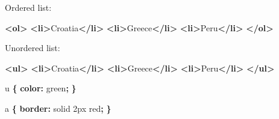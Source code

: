 \documentclass[]{memoir}
\newenvironment{Shaded}{}{}
\newcommand{\KeywordTok}[1]{\textcolor[rgb]{0.00,0.44,0.13}{\textbf{{#1}}}}
\newcommand{\DataTypeTok}[1]{\textcolor[rgb]{0.56,0.13,0.00}{{#1}}}
\newcommand{\NormalTok}[1]{{#1}}
\begin{document}
Ordered list:

\begin{Shaded}
\begin{Highlighting}[]
\KeywordTok{<ol>}
    \KeywordTok{<li>}\NormalTok{Croatia}\KeywordTok{</li>}
    \KeywordTok{<li>}\NormalTok{Greece}\KeywordTok{</li>}
    \KeywordTok{<li>}\NormalTok{Peru}\KeywordTok{</li>}
\KeywordTok{</ol>}
\end{Highlighting}
\end{Shaded}

Unordered list:

\begin{Shaded}
\begin{Highlighting}[]
\KeywordTok{<ul>}
    \KeywordTok{<li>}\NormalTok{Croatia}\KeywordTok{</li>}
    \KeywordTok{<li>}\NormalTok{Greece}\KeywordTok{</li>}
    \KeywordTok{<li>}\NormalTok{Peru}\KeywordTok{</li>}
\KeywordTok{</ul>}
\end{Highlighting}
\end{Shaded}


\begin{Shaded}
\begin{Highlighting}[]
\NormalTok{u }\KeywordTok{\{}
    \KeywordTok{color:} \DataTypeTok{green}\KeywordTok{;}
\KeywordTok{\}}
\end{Highlighting}
\end{Shaded}


\begin{Shaded}
\begin{Highlighting}[]
\NormalTok{a }\KeywordTok{\{}
    \KeywordTok{border:} \DataTypeTok{solid} \DataTypeTok{2px} \DataTypeTok{red}\KeywordTok{;}
\KeywordTok{\}}
\end{Highlighting}
\end{Shaded}

\end{document}
